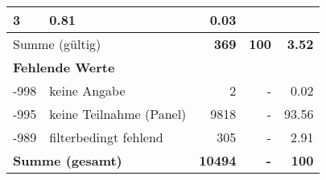 \begin{longtable}{lXrrr}
       \num{3} &
       \num[round-mode=places,round-precision=2]{0.81} &
         \num[round-mode=places,round-precision=2]{0.03} \\
     \midrule
     \multicolumn{2}{l}{Summe (gültig)} &
       \textbf{\num{369}} &
     \textbf{\num{100}} &
       \textbf{\num[round-mode=places,round-precision=2]{3.52}} \\
     \multicolumn{5}{l}{\textbf{Fehlende Werte}}\\
       -998 &
       keine Angabe &
         \num{2} &
        - &
         \num[round-mode=places,round-precision=2]{0.02} \\
       -995 &
       keine Teilnahme (Panel) &
         \num{9818} &
        - &
         \num[round-mode=places,round-precision=2]{93.56} \\
       -989 &
       filterbedingt fehlend &
         \num{305} &
        - &
         \num[round-mode=places,round-precision=2]{2.91} \\
     \midrule
     \multicolumn{2}{l}{\textbf{Summe (gesamt)}} &
          \textbf{\num{10494}} &
        \textbf{-} &
        \textbf{\num{100}} \\
     \bottomrule
     \end{longtable}
     
